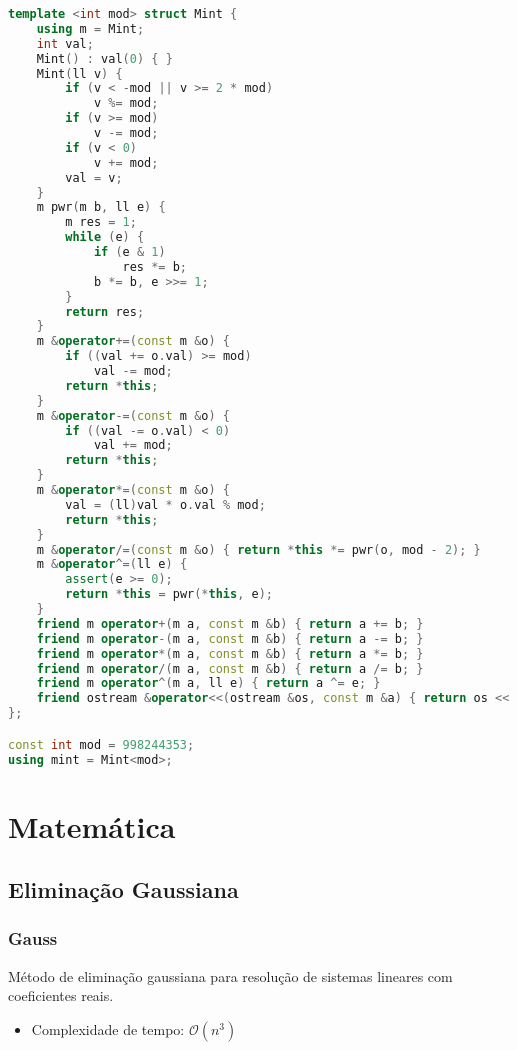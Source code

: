 \documentclass[10pt, a4paper, oneside]{book}
\begin{document}
\begin{lstlisting}[language=C++]
template <int mod> struct Mint {
    using m = Mint;
    int val;
    Mint() : val(0) { }
    Mint(ll v) {
        if (v < -mod || v >= 2 * mod)
            v %= mod;
        if (v >= mod)
            v -= mod;
        if (v < 0)
            v += mod;
        val = v;
    }
    m pwr(m b, ll e) {
        m res = 1;
        while (e) {
            if (e & 1)
                res *= b;
            b *= b, e >>= 1;
        }
        return res;
    }
    m &operator+=(const m &o) {
        if ((val += o.val) >= mod)
            val -= mod;
        return *this;
    }
    m &operator-=(const m &o) {
        if ((val -= o.val) < 0)
            val += mod;
        return *this;
    }
    m &operator*=(const m &o) {
        val = (ll)val * o.val % mod;
        return *this;
    }
    m &operator/=(const m &o) { return *this *= pwr(o, mod - 2); }
    m &operator^=(ll e) {
        assert(e >= 0);
        return *this = pwr(*this, e);
    }
    friend m operator+(m a, const m &b) { return a += b; }
    friend m operator-(m a, const m &b) { return a -= b; }
    friend m operator*(m a, const m &b) { return a *= b; }
    friend m operator/(m a, const m &b) { return a /= b; }
    friend m operator^(m a, ll e) { return a ^= e; }
    friend ostream &operator<<(ostream &os, const m &a) { return os << a.val; }
};

const int mod = 998244353;
using mint = Mint<mod>;
\end{lstlisting}
\hfill

\newpage

%
%
%
%

\chapter{Matemática}

\section{Eliminação Gaussiana}
\subsection{Gauss}


Método de eliminação gaussiana para resolução de sistemas lineares com coeficientes reais.



\begin{itemize}
\item Complexidade de tempo: $\mathcal{O}(n^3)$
\end{itemize}
\end{document}

